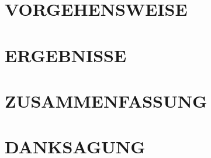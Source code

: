 \documentclass[a4paper,twoside]{article}
\begin{document}
\section{\uppercase{Vorgehensweise}}
\noindent 

\section{\uppercase{Ergebnisse}}
\noindent 

\section{\uppercase{Zusammenfassung}}
\noindent 

\section*{\uppercase{Danksagung}}

\vfill

{\small
}
\end{document}
